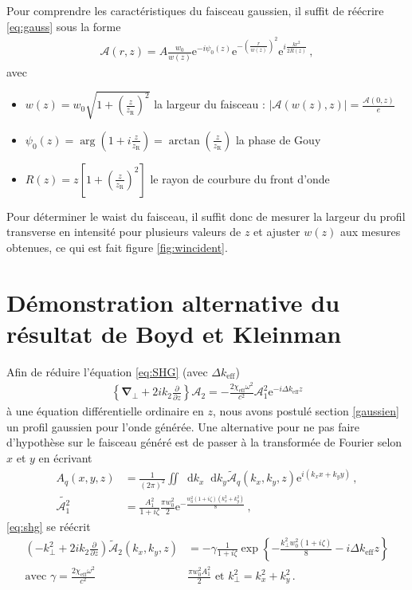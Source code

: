\documentclass[11pt,a4paper]{article}
\newcommand{\pdv}[2]{\frac{\partial #1}{\partial #2}}
\newcommand{\diff}{\mathop{}\!\mathrm{d}}
\newcommand{\zr}{z_\mathsc{R}}
\newcommand{\chie}{\chi_\mathsc{eff}}
\newcommand{\dke}{\Delta k_\mathsc{eff}}
\newcommand{\A}{\mathcal{A}}
\newcommand{\e}[1]{\text{e}^{#1}}
\newcommand{\mathsc}[1]{\mathrm{\scriptscriptstyle {#1}}}
\renewcommand{\v}[1]{\boldsymbol{\mathbf{#1}}}
\begin{document}
Pour comprendre les caractéristiques du faisceau gaussien, il suffit de réécrire \eqref{eq:gauss} sous la forme
\begin{align}
\A(r,z) = A \frac{w_0}{w(z)} \e{-i \psi_0(z)} \e{-\left(\frac{r}{w(z)}\right)^2} \e{i \frac{kr^2}{2 R(z)}} \,,
\end{align}
avec 
\begin{itemize}
\item $w(z) = w_0 \sqrt{1+\left(\frac{z}{\zr}\right)^2}$ la largeur du faisceau : $|\A(w(z),z)| = \frac{\A(0,z)}{e}$
\item $\psi_0(z) = \arg\left(1+i\frac{z}{\zr}\right) = \arctan\left(\frac{z}{\zr}\right)$ la phase de Gouy
\item $R(z) = z \left[1+\left(\frac{z}{\zr}\right)^2\right]$
le rayon de courbure du front d'onde
\end{itemize}

Pour déterminer le waist du faisceau, il suffit donc de mesurer la largeur du profil transverse en intensité pour plusieurs valeurs de $z$ et ajuster $w(z)$ aux mesures obtenues, ce qui est fait figure \ref{fig:wincident}.

\section{Démonstration alternative du résultat de Boyd et Kleinman}
\label{BK}

Afin de réduire l'équation \eqref{eq:SHG} (avec $\dke$)
\begin{align}
	\label{eq:shg}
	\left\{\v\nabla_\bot + 2 i k_2 \frac{\partial}{\partial z} \right\} \A_2 = - \frac{2 \chie \omega^2}{c^2} \A_1^2 \e{- i \dke z}
\end{align}
à une équation différentielle ordinaire en $z$, nous avons postulé section \ref{gaussien} un profil gaussien pour l'onde générée. Une alternative pour ne pas faire d'hypothèse sur le faisceau généré est de passer à la transformée de Fourier selon $x$ et $y$ en écrivant 
\begin{align}
A_q(x,y,z) &= \frac{1}{(2\pi)^2} \iint \diff{k_x} \diff{k_y} \tilde{\A}_q (k_x,k_y,z) \e{i \left(k_x x + k_y y \right)} \,, \\
\widetilde{\A_1^2} &= \frac{A_1^2}{1+i\zeta} \frac{\pi w_0^2}{2} \e{-\frac{w_0^2 (1+i\zeta) \left(k_x^2 + k_y^2\right)}{8} } \,,
\end{align}
\eqref{eq:shg} se réécrit
\begin{align}
\left(-k_\bot^2 + 2 i k_2 \pdv{}{z} \right) \tilde{\A}_2(k_x,k_y,z) 
&= - \gamma \frac{1}{1+i\zeta} \exp\left\{-\frac{k_\bot^2 w_0^2 (1+i\zeta)}{8} - i \dke z \right\} \\
\text{avec } \gamma = \frac{2 \chie \omega^2}{c^2}
& \frac{\pi w_0^2 A_1^2}{2} \text{ et } k_\bot^2 = k_x^2 + k_y^2 \,.
\end{align}
\end{document}
